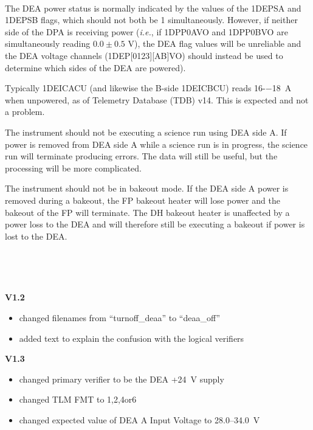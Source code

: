\documentclass[11pt]{article}
\begin{document}

\normalsize
{} \\
\normalsize

The DEA power status is normally indicated by the values of the 1DEPSA and
1DEPSB flags, which should not both be 1 simultaneously.
However, if neither side of the DPA is receiving power
({\it i.e.}, if 1DPP0AVO and 1DPP0BVO are simultaneously reading $0.0 \pm 0.5$ V),
the DEA flag values will be unreliable and the DEA voltage
channels (1DEP[0123][AB]VO) should instead be used to determine which
sides of the DEA are powered).

Typically 1DEICACU (and likewise the B-side 1DEICBCU) reads 16-−18~A when 
unpowered, as of Telemetry Database (TDB) v14. This is expected and not a problem.

The instrument should not be executing a science run using DEA side A. 
If power is removed from DEA side A while a science run is in progress, the science 
run will terminate producing errors. The data will still be useful, but the processing 
will be more complicated.

The instrument should not be in bakeout mode. If the DEA side A power is 
removed during a bakeout, the FP bakeout heater will lose power and the bakeout of 
the FP will terminate. The DH bakeout heater is unaffected by a power loss to the 
DEA and will therefore still be executing a bakeout if power is lost to the DEA.

\vspace{0.15in}
\normalsize
{} \\
\normalsize

\normalsize
{} \\
\normalsize

{\bf V1.2}
\begin{itemize}
\item changed filenames from ``turnoff\_deaa'' to
``deaa\_off''
\item added text to explain the confusion with the logical verifiers
\end{itemize}

{\bf V1.3}
\begin{itemize}
\item changed primary verifier to be the DEA +24~V supply
\item changed TLM FMT to 1,2,4or6
\item changed expected value of DEA A Input Voltage to 28.0--34.0~V
\end{itemize}
\end{document}
